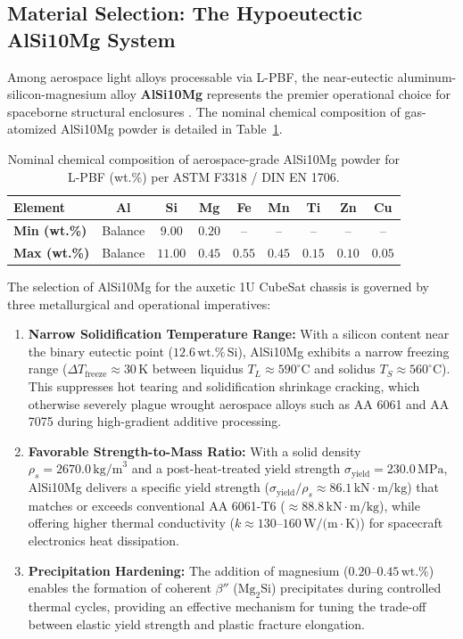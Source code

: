 \subsection{Material Selection: The Hypoeutectic AlSi10Mg System}
Among aerospace light alloys processable via L-PBF, the near-eutectic aluminum-silicon-magnesium alloy \textbf{AlSi10Mg} represents the premier operational choice for spaceborne structural enclosures \cite{kempen2012,aboulkhair2014}. The nominal chemical composition of gas-atomized AlSi10Mg powder is detailed in Table~\ref{tab:alsi10mg_composition}.

\begin{table}[htbp]
\centering
\caption{Nominal chemical composition of aerospace-grade AlSi10Mg powder for L-PBF (wt.\%) per ASTM F3318 / DIN EN 1706.}
\label{tab:alsi10mg_composition}
\begin{tabular}{lcccccccc}
\toprule
\textbf{Element} & \textbf{Al} & \textbf{Si} & \textbf{Mg} & \textbf{Fe} & \textbf{Mn} & \textbf{Ti} & \textbf{Zn} & \textbf{Cu} \\
\midrule
\textbf{Min (wt.\%)} & Balance & $9.00$ & $0.20$ & -- & -- & -- & -- & -- \\
\textbf{Max (wt.\%)} & Balance & $11.00$ & $0.45$ & $0.55$ & $0.45$ & $0.15$ & $0.10$ & $0.05$ \\
\bottomrule
\end{tabular}
\end{table}

The selection of AlSi10Mg for the auxetic 1U CubeSat chassis is governed by three metallurgical and operational imperatives:
\begin{enumerate}
\item \textbf{Narrow Solidification Temperature Range:} With a silicon content near the binary eutectic point ($12.6\,\text{wt.\%}\,\text{Si}$), AlSi10Mg exhibits a narrow freezing range ($\Delta T_{\text{freeze}} \approx 30\,\text{K}$ between liquidus $T_L \approx 590^\circ\text{C}$ and solidus $T_S \approx 560^\circ\text{C}$). This suppresses hot tearing and solidification shrinkage cracking, which otherwise severely plague wrought aerospace alloys such as AA 6061 and AA 7075 during high-gradient additive processing.
\item \textbf{Favorable Strength-to-Mass Ratio:} With a solid density $\rho_s = 2670.0\,\text{kg/m}^3$ and a post-heat-treated yield strength $\sigma_{\text{yield}} = 230.0\,\text{MPa}$, AlSi10Mg delivers a specific yield strength ($\sigma_{\text{yield}} / \rho_s \approx 86.1\,\text{kN}\cdot\text{m/kg}$) that matches or exceeds conventional AA 6061-T6 ($\approx 88.8\,\text{kN}\cdot\text{m/kg}$), while offering higher thermal conductivity ($k \approx 130\text{--}160\,\text{W/(m}\cdot\text{K)}$) for spacecraft electronics heat dissipation.
\item \textbf{Precipitation Hardening:} The addition of magnesium ($0.20\text{--}0.45\,\text{wt.\%}$) enables the formation of coherent $\beta''$ ($\text{Mg}_2\text{Si}$) precipitates during controlled thermal cycles, providing an effective mechanism for tuning the trade-off between elastic yield strength and plastic fracture elongation.
\end{enumerate}

